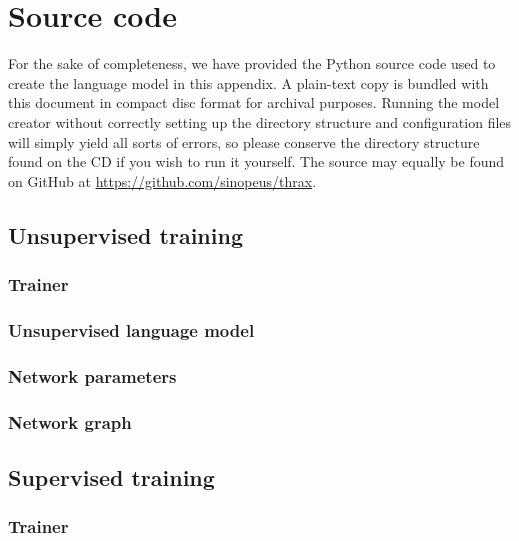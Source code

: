 \chapter{Source code}
\label{chp:sourcecode}
For the sake of completeness, we have provided the Python source code
used to create the language model in this appendix. A plain-text copy
is bundled with this document in compact disc format for archival
purposes. Running the model creator without correctly setting up the
directory structure and configuration files will simply yield all
sorts of errors, so please conserve the directory structure found on
the CD if you wish to run it yourself. The source may equally be found
on GitHub at \url{https://github.com/sinopeus/thrax}.

\section{Unsupervised training}
\subsection{Trainer}
\label{sec:trainer}

\subsection{Unsupervised language model}
\label{sec:langmodel}

\subsection{Network parameters}
\label{sec:nnetworkparams}

\subsection{Network graph}
\label{sec:modelcost}


\section{Supervised training}
\subsection{Trainer}
\label{sec:trainer}

